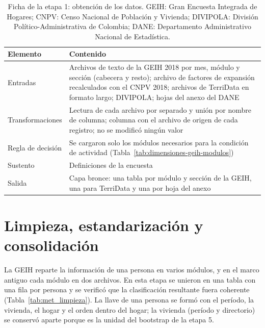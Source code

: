 \begin{table}[!htbp]
\centering
\small
\caption[Ficha de la etapa 1: obtención de los datos]{Ficha de la etapa 1: obtención de los datos. GEIH: Gran Encuesta Integrada de Hogares; CNPV: Censo Nacional de Población y Vivienda; DIVIPOLA: División Político-Administrativa de Colombia; DANE: Departamento Administrativo Nacional de Estadística.}
\label{tab:met_obtencion}
\renewcommand{\arraystretch}{1.15}
\begin{tabularx}{\linewidth}{>{\raggedright\arraybackslash}p{2.8cm} >{\raggedright\arraybackslash}X}
\toprule
Elemento & Contenido \\
\midrule
Entradas & Archivos de texto de la GEIH 2018 por mes, módulo y sección (cabecera y resto); archivo de factores de expansión recalculados con el CNPV 2018; archivos de TerriData en formato largo; DIVIPOLA; hojas del anexo del DANE \\
Transformaciones & Lectura de cada archivo por separado y unión por nombre de columna; columna con el archivo de origen de cada registro; no se modificó ningún valor \\
Regla de decisión & Se cargaron solo los módulos necesarios para la condición de actividad (Tabla~\ref{tab:dimensiones-geih-modulos}) \\
Sustento & Definiciones de la encuesta \cite[p.~20]{DANE_GEIH_Metodologia2016} \\
Salida & Capa bronce: una tabla por módulo y sección de la GEIH, una para TerriData y una por hoja del anexo \\
\bottomrule
\end{tabularx}
\end{table}

\section{Limpieza, estandarización y consolidación}
\label{sec:met_limpieza}

La GEIH reparte la información de una persona en varios módulos, y en el marco antiguo cada módulo en dos archivos. En esta etapa se unieron en una tabla con una fila por persona y se verificó que la clasificación resultante fuera coherente (Tabla~\ref{tab:met_limpieza}). La llave de una persona se formó con el período, la vivienda, el hogar y el orden dentro del hogar; la vivienda (período y directorio) se conservó aparte porque es la unidad del bootstrap de la etapa 5.

